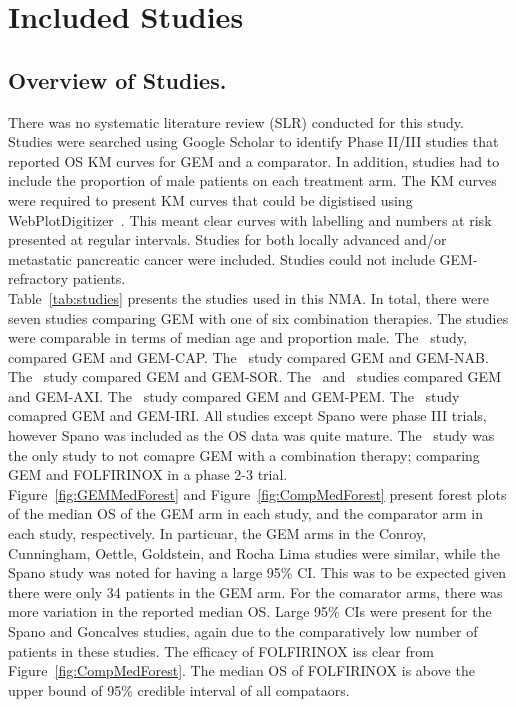 \chapter{Included Studies}\label{trialschap}

\section{Overview of Studies.}
There was no systematic literature review (SLR) conducted for this study. Studies were searched using Google Scholar to identify Phase II/III studies that reported OS KM curves for GEM and a comparator. In addition, studies had to include the proportion of male patients on each treatment arm. The KM curves were required to present KM curves that could be digistised using WebPlotDigitizer~\cite{wpd}. This meant clear curves with labelling and numbers at risk presented at regular intervals. Studies for both locally advanced and/or metastatic pancreatic cancer were included. Studies could not include GEM-refractory patients.\\

Table~\ref{tab:studies} presents the studies used in this NMA. In total, there were seven studies comparing GEM with one of six combination therapies. The studies were comparable in terms of median age and proportion male. The~\cite{cunningham2009} study, compared GEM and GEM-CAP. The~\cite{goldstein2015} study compared GEM and GEM-NAB. The~\cite{gonccalves2012} study compared GEM and GEM-SOR. The~\cite{kindler2011} and~\cite{spano2008} studies compared GEM and GEM-AXI. The~\cite{oettle2005} study compared GEM and GEM-PEM. The~\cite{rocha2004} study comapred GEM and GEM-IRI. All studies except Spano were phase III trials, however Spano was included as the OS data was quite mature. The~\cite{conroy} study was the only study to not comapre GEM with a combination therapy; comparing GEM and FOLFIRINOX in a phase 2-3 trial.\\

Figure~\ref{fig:GEMMedForest} and Figure~\ref{fig:CompMedForest} present forest plots of the median OS of the GEM arm in each study, and the comparator arm in each study, respectively. In particuar, the GEM arms in the Conroy, Cunningham, Oettle, Goldstein, and Rocha Lima studies were similar, while the Spano study was noted for having a large 95\% CI. This was to be expected given there were only 34 patients in the GEM arm. For the comarator arms, there was more variation in the reported median OS. Large 95\% CIs were present for the Spano and Goncalves studies, again due to the comparatively low number of patients in these studies. The efficacy of FOLFIRINOX iss clear from Figure~\ref{fig:CompMedForest}. The median OS of FOLFIRINOX is above the upper bound of 95\% credible interval of all compataors. \\

